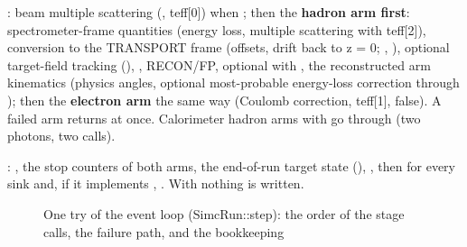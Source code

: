 \textbf{}: beam multiple scattering (, teff[0]) when ; then the
\textbf{hadron arm first}: spectrometer-frame quantities (energy loss, multiple scattering with teff[2]), conversion to the
TRANSPORT frame (offsets, drift back to z = 0; , ), optional target-field tracking
(), , RECON/FP, optional  with
, the reconstructed arm kinematics (physics angles, optional most-probable
energy-loss correction through ); then the \textbf{electron arm} the same way (Coulomb correction, teff[1],
 false). A failed arm returns at once. Calorimeter hadron arms with  go through
 (two photons, two  calls).

\textbf{}: , the stop counters of both arms, the end-of-run target
state (), , then for every sink  and, if it implements
, . With  nothing is written.

\begin{figure}[htbp]
\caption[One try of the event loop (SimcRun::\allowbreak{}step)]{One try of the event loop (SimcRun::\allowbreak{}step): the order of the stage calls, the failure path, and the bookkeeping}\label{fig:eventu5ftry}
\end{figure}
